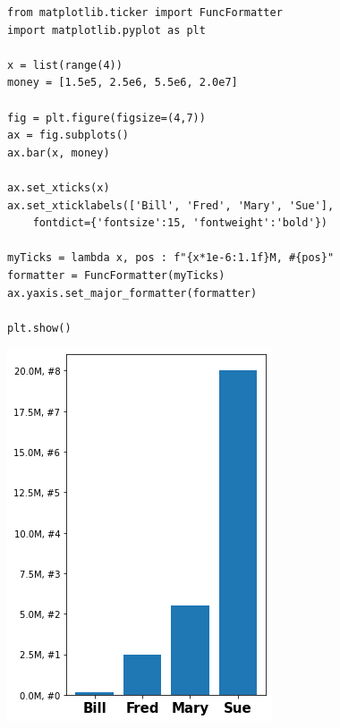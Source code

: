 
\begin{frame}[fragile]
%
\begin{codebox}[Example: Tickmarks, width=.63\linewidth, nobeforeafter, equal height group = grpXmpFormatter]
\begin{verbatim}
from matplotlib.ticker import FuncFormatter
import matplotlib.pyplot as plt

x = list(range(4))
money = [1.5e5, 2.5e6, 5.5e6, 2.0e7]

fig = plt.figure(figsize=(4,7))
ax = fig.subplots()
ax.bar(x, money)

ax.set_xticks(x)
ax.set_xticklabels(['Bill', 'Fred', 'Mary', 'Sue'],
    fontdict={'fontsize':15, 'fontweight':'bold'})

myTicks = lambda x, pos : f"{x*1e-6:1.1f}M, #{pos}"
formatter = FuncFormatter(myTicks)
ax.yaxis.set_major_formatter(formatter)

plt.show()
\end{verbatim}
\end{codebox}
%
\begin{tcolorbox}[title=Output: Tickmarks, width=.34\linewidth, nobeforeafter, equal height group = grpXmpFormatter]
	\hspace{-13pt}
	\includegraphics[width=1.22\linewidth]{./gfx/plt-TicksFormatter}
\end{tcolorbox}
%
\end{frame}

